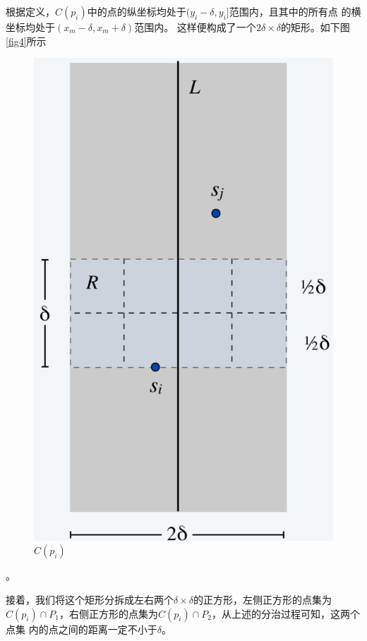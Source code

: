 根据定义，$C(p_i)$中的点的纵坐标均处于$(y_i - \delta, y_i]$范围内，且其中的所有点
的横坐标均处于$\left( x_m - \delta, x_m + \delta \right)$范围内。
这样便构成了一个$2\delta\times\delta$的矩形。如下图\autoref{fig4}所示
\begin{figure}[htb]
    \centering
    \includegraphics[scale=0.5]{image/NearestPointsCpi.png}
    \caption{$C(p_i)$}\label{fig4}
\end{figure}。

接着，我们将这个矩形分拆成左右两个$\delta \times \delta$的正方形，左侧正方形的点集为
$C(p_i)\cap P_1$，右侧正方形的点集为$C(p_i)\cap P_2$，从上述的分治过程可知，这两个点集
内的点之间的距离一定不小于$\delta$。

